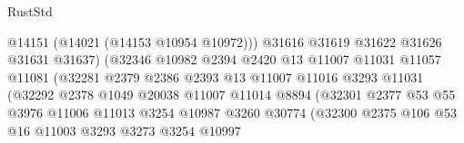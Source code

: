 \begin{lexlean}{RustStd}
\begin{coremodule}
                                        @14151
                                        (@14021 (@14153 @10954 @10972)))
                                      @31616
                                      @31619
                                      @31622
                                      @31626
                                      @31631
                                      @31637)
                                    (@32346
                                      @10982
                                      @2394
                                      @2420
                                      @13
                                      @11007
                                      @11031
                                      @11057
                                      @11081
                                      (@32281
                                        @2379
                                        @2386
                                        @2393
                                        @13
                                        @11007
                                        @11016
                                        @3293
                                        @11031
                                        (@32292
                                          @2378
                                          @1049
                                          @20038
                                          @11007
                                          @11014
                                          @8894
                                          (@32301
                                            @2377
                                            @53
                                            @55
                                            @3976
                                            @11006
                                            @11013
                                            @3254
                                            @10987
                                            @3260
                                            @30774
                                            (@32300
                                              @2375
                                              @106
                                              @53
                                              @16
                                              @11003
                                              @3293
                                              @3273
                                              @3254
                                              @10997

\end{coremodule}
\end{lexlean}
